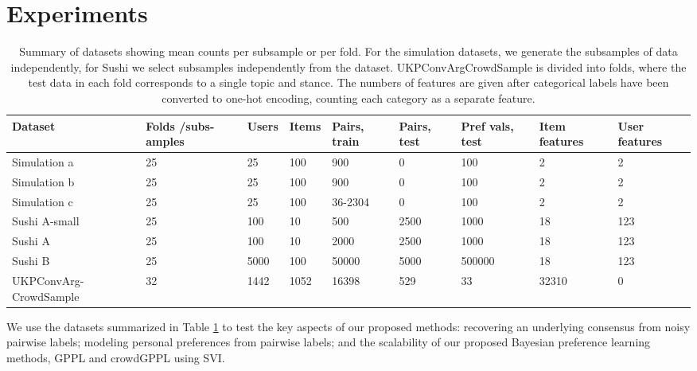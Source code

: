 \section{Experiments}\label{sec:expts}


\begin{table}[h]
\small
\begin{tabularx}{\textwidth}{| p{1.8cm} | X | X | X | X | X | X | X | X |}
\hline
Dataset & Folds /subs-amples & Users & Items & Pairs, train & Pairs, test & Pref vals, test & Item features & User features \\
\hline\hline
Simulation a & 25 & 25 & 100 & 900 & 0 & 100 & 2 & 2 \\
Simulation b & 25 & 25 & 100 & 900 & 0 & 100 & 2 & 2\\
Simulation c & 25 & 25 & 100 & 36-2304 & 0 & 100 & 2 & 2\\
\hline
Sushi A-small & 25 & 100 & 10 & 500 & 2500 & 1000 & 18 & 123 \\
Sushi A & 25 & 100 & 10 & 2000 & 2500 & 1000 & 18 & 123 \\
Sushi B & 25 & 5000 & 100 & 50000 & 5000 & 500000 &  18 & 123 \\
\hline
UKPConvArg-CrowdSample & 32 & 1442 & 1052 & 16398 & 529 & 33 & 32310 & 0
\\ \hline
\end{tabularx}
\caption{Summary of datasets showing mean counts per subsample or per fold. For the simulation datasets, we generate the subsamples of data independently, for Sushi we select subsamples independently from the dataset.  
UKPConvArgCrowdSample is divided into folds, where the test data in each fold corresponds to a single topic and stance. The numbers of features are given after categorical labels have been converted to one-hot encoding, counting
each category as a separate feature.
}
\label{tab:datasets}
\end{table}
We use the datasets summarized in Table \ref{tab:datasets} to test the key aspects of our proposed methods: recovering an underlying consensus from noisy pairwise labels; modeling personal preferences from pairwise labels; and the scalability of our proposed Bayesian preference learning methods, GPPL and crowdGPPL using SVI.
